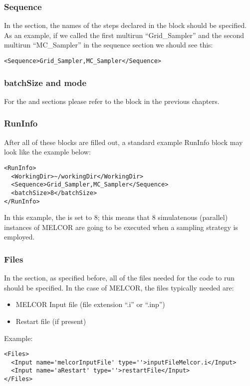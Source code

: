 \subsubsection{Sequence}
In the  section, the names of the steps declared in the
 block should be specified.
%
As an example, if we called the first multirun ``Grid\_Sampler'' and the second
multirun ``MC\_Sampler'' in the sequence section we should see this:
\begin{lstlisting}[style=XML]
<Sequence>Grid_Sampler,MC_Sampler</Sequence>
\end{lstlisting}

\subsubsection{batchSize and mode}
For the  and  sections please refer to the
 block in the previous chapters.
%
\subsubsection{RunInfo}
After all of these blocks are filled out, a standard example RunInfo block may
look like the example below:
\begin{lstlisting}[style=XML]
<RunInfo>
  <WorkingDir>~/workingDir</WorkingDir>
  <Sequence>Grid_Sampler,MC_Sampler</Sequence>
  <batchSize>8</batchSize>
</RunInfo>
\end{lstlisting}
In this example, the  is set to $8$; this means that 8 simulatenous (parallel) instances
of MELCOR are going to be executed when a sampling strategy is employed.
\subsubsection{Files}
In the  section, as specified before, all of the files needed for
the code to run should be specified.
%
In the case of MELCOR, the files typically needed are:
\begin{itemize}
  \item MELCOR Input file (file extension ``.i'' or ``.inp'')
  \item Restart file (if present)
\end{itemize}
Example:
\begin{lstlisting}[style=XML]
<Files>
  <Input name='melcorInputFile' type=''>inputFileMelcor.i</Input>
  <Input name='aRestart' type=''>restartFile</Input>
</Files>
\end{lstlisting}

